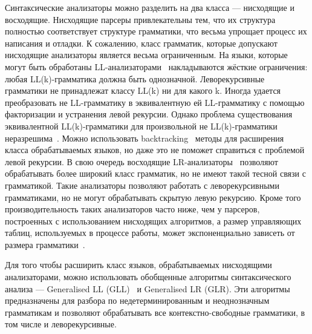 Синтаксические анализаторы можно разделить на два класса --- нисходящие и восходящие. Нисходящие парсеры привлекательны тем, что их структура полностью соответствует структуре грамматики, что весьма упрощает процесс их написания и отладки. К сожалению, класс грамматик, которые допускают нисходящие анализаторы является весьма ограниченным. На языки, которые могут быть обработаны LL-анализаторами~\cite{aho} накладываются жёсткие ограничения: любая LL(k)-грамматика должна быть однозначной. Леворекурсивные  грамматики не принадлежат классу LL(k) ни для  какого  k. Иногда удается преобразовать не LL-грамматику в эквивалентную ей LL-грамматику с  помощью факторизации  и устранения левой рекурсии. Однако  проблема  существования эквивалентной LL(k)-грамматики для произвольной  не LL(k)-грамматики неразрешима~\cite{rose}. Можно использовать backtracking~\cite{grune} методы для расширения класса обрабатываемых языков, но даже это не поможет справиться с проблемой левой рекурсии. В свою очередь восходящие LR-анализаторы~\cite{aho} позволяют обрабатывать более широкий класс грамматик, но не имеют такой тесной связи с грамматикой. Такие анализаторы позволяют работать с леворекурсивными грамматиками, но не могут обрабатывать скрытую левую рекурсию. Кроме того производительность таких анализаторов часто ниже, чем у парсеров, построенных с использованием нисходящих алгоритмов, а размер управляющих таблиц, используемых в процессе работы, может экспоненциально зависеть от размера грамматики~\cite{grune2}.

Для того чтобы расширить класс языков, обрабатываемых нисходящими анализаторами, можно использовать обобщенные алгоритмы синтаксического анализа --- Generalised LL (GLL)~\cite{gll} и Generalised LR (GLR). Эти алгоритмы предназначены для разбора по недетерминированным и неоднозначным грамматикам и позволяют обрабатывать все контекстно-свободные грамматики, в том числе и леворекурсивные. 

